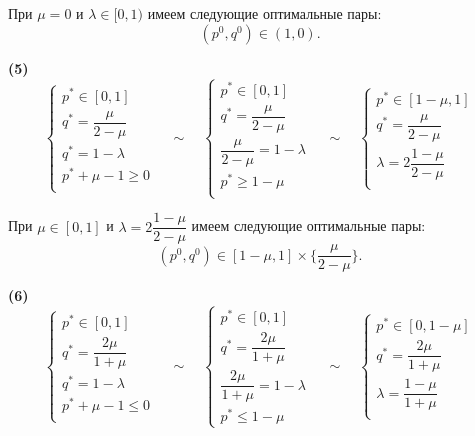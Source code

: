 При $\mu=0$ и $\lambda \in [0, 1)$ имеем следующие оптимальные пары:
$$
	(p^0, q^0) \in (1, 0).
$$

\textbf{(5)}
$$
	\begin{cases}
		p^* \in [0, 1] \\
		q^* = \dfrac{\mu}{2-\mu} \\
		q^* = 1 - \lambda \\
		p^* + \mu - 1 \geqslant 0 \\
	\end{cases}
	\quad \sim \quad
	\begin{cases}
		p^* \in [0, 1] \\
		q^* = \dfrac{\mu}{2-\mu} \\
		\dfrac{\mu}{2-\mu} = 1 - \lambda \\
		p^* \geqslant 1 - \mu \\
	\end{cases}
	\quad \sim \quad
	\begin{cases}
		p^* \in [1 - \mu, 1] \\
		q^* = \dfrac{\mu}{2-\mu} \\
		\lambda = 2\dfrac{1-\mu}{2-\mu} \\
	\end{cases}
$$

При $\mu \in [0, 1]$ и $\lambda = 2\dfrac{1 - \mu}{2 - \mu}$ 
имеем следующие оптимальные пары:
$$
	(p^0, q^0) \in [1 - \mu, 1] \times  \{ \frac{\mu}{2 - \mu}\}.
$$

\textbf{(6)}
$$
	\begin{cases}
		p^* \in [0, 1] \\
		q^*= \dfrac{2\mu}{1+\mu} \\
		q^* = 1 - \lambda \\
		p^* + \mu - 1 \leqslant 0 \\
	\end{cases}
	\quad \sim \quad
	\begin{cases}
		p^* \in [0, 1] \\
		q^* = \dfrac{2\mu}{1+\mu} \\
		\dfrac{2\mu}{1+\mu} = 1 - \lambda \\
		p^* \leqslant 1 - \mu 
	\end{cases}
	\quad \sim \quad
	\begin{cases}
		p^* \in [0, 1 - \mu] \\
		q^* = \dfrac{2\mu}{1+\mu} \\
		\lambda = \dfrac{1-\mu}{1+\mu} \\
	\end{cases}
$$

